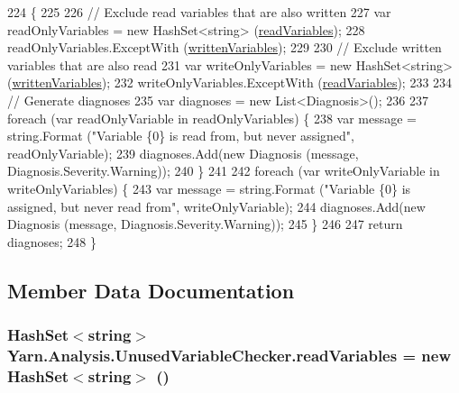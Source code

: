 \begin{DoxyCode}
224         \{
225 
226             \textcolor{comment}{// Exclude read variables that are also written}
227             var readOnlyVariables = \textcolor{keyword}{new} HashSet<string> (\hyperlink{a00179_a6b542092ddce1b92c9455d60899518a9}{readVariables});
228             readOnlyVariables.ExceptWith (\hyperlink{a00179_a0c2fe6eded1b10b135ca2469f5980a39}{writtenVariables});
229 
230             \textcolor{comment}{// Exclude written variables that are also read}
231             var writeOnlyVariables = \textcolor{keyword}{new} HashSet<string> (\hyperlink{a00179_a0c2fe6eded1b10b135ca2469f5980a39}{writtenVariables});
232             writeOnlyVariables.ExceptWith (\hyperlink{a00179_a6b542092ddce1b92c9455d60899518a9}{readVariables});
233 
234             \textcolor{comment}{// Generate diagnoses}
235             var diagnoses = \textcolor{keyword}{new} List<Diagnosis>();
236 
237             \textcolor{keywordflow}{foreach} (var readOnlyVariable \textcolor{keywordflow}{in} readOnlyVariables) \{
238                 var message = string.Format (\textcolor{stringliteral}{"Variable \{0\} is read from, but never assigned"}, 
      readOnlyVariable);
239                 diagnoses.Add(\textcolor{keyword}{new} Diagnosis (message, Diagnosis.Severity.Warning));
240             \}
241 
242             \textcolor{keywordflow}{foreach} (var writeOnlyVariable \textcolor{keywordflow}{in} writeOnlyVariables) \{
243                 var message = string.Format (\textcolor{stringliteral}{"Variable \{0\} is assigned, but never read from"}, 
      writeOnlyVariable);
244                 diagnoses.Add(\textcolor{keyword}{new} Diagnosis (message, Diagnosis.Severity.Warning));
245             \}
246 
247             \textcolor{keywordflow}{return} diagnoses;
248         \}
\end{DoxyCode}


\subsection{Member Data Documentation}
\hypertarget{a00179_a6b542092ddce1b92c9455d60899518a9}{
\subsubsection[{read\-Variables}]{\setlength{\rightskip}{0pt plus 5cm}Hash\-Set$<$string$>$ Yarn.\-Analysis.\-Unused\-Variable\-Checker.\-read\-Variables = new Hash\-Set$<$string$>$ ()\hspace{0.3cm}{\ttfamily [private]}}}\label{a00179_a6b542092ddce1b92c9455d60899518a9}


